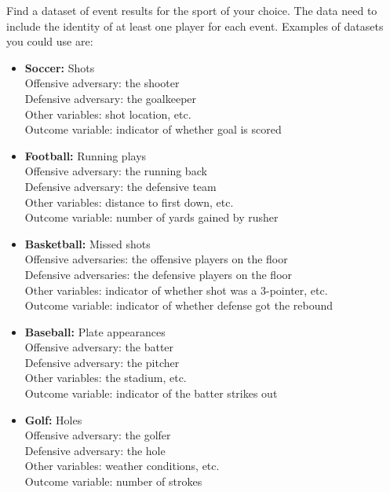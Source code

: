 \documentclass{article}
\begin{document}
      Find a dataset of event results for the sport of your choice. The data need to include the identity of at least one player for each event. Examples of datasets you could use are:
      \begin{itemize}
        \footnotesize
        \item {\bf Soccer:} Shots\\
          Offensive adversary: the shooter\\
          Defensive adversary: the goalkeeper\\
          Other variables: shot location, etc.\\
          Outcome variable: indicator of whether goal is scored
        \item {\bf Football:} Running plays\\
          Offensive adversary: the running back\\
          Defensive adversary: the defensive team\\
          Other variables: distance to first down, etc.\\
          Outcome variable: number of yards gained by rusher
        \item {\bf Basketball:} Missed shots\\
          Offensive adversaries: the offensive players on the floor\\
          Defensive adversaries: the defensive players on the floor\\
          Other variables: indicator of whether shot was a 3-pointer, etc.\\
          Outcome variable: indicator of whether defense got the rebound
        \item {\bf Baseball:} Plate appearances\\
          Offensive adversary: the batter\\
          Defensive adversary: the pitcher\\
          Other variables: the stadium, etc.\\
          Outcome variable: indicator of the batter strikes out
        \item {\bf Golf:} Holes\\
          Offensive adversary: the golfer\\
          Defensive adversary: the hole\\
          Other variables: weather conditions, etc.\\
          Outcome variable: number of strokes
      \end{itemize}
\end{document}
